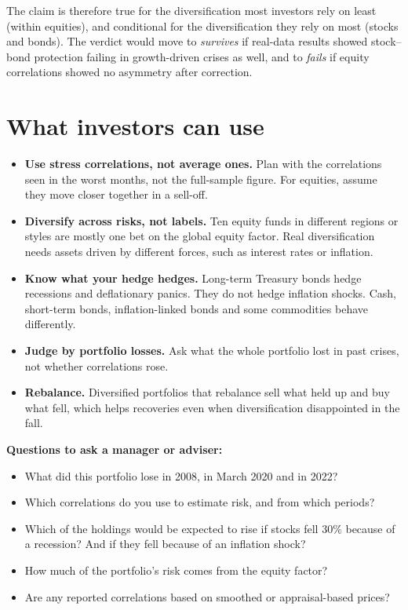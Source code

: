 The claim is therefore true for the diversification most investors rely on least (within equities), and conditional for the diversification they rely on most (stocks and bonds). The verdict would move to \emph{survives} if real-data results showed stock--bond protection failing in growth-driven crises as well, and to \emph{fails} if equity correlations showed no asymmetry after correction.

\section{What investors can use}
\label{sec:20-investors}

\begin{itemize}
  \item \textbf{Use stress correlations, not average ones.} Plan with the correlations seen in the worst months, not the full-sample figure. For equities, assume they move closer together in a sell-off.
  \item \textbf{Diversify across risks, not labels.} Ten equity funds in different regions or styles are mostly one bet on the global equity factor. Real diversification needs assets driven by different forces, such as interest rates or inflation.
  \item \textbf{Know what your hedge hedges.} Long-term Treasury bonds hedge recessions and deflationary panics. They do not hedge inflation shocks. Cash, short-term bonds, inflation-linked bonds and some commodities behave differently.
  \item \textbf{Judge by portfolio losses.} Ask what the whole portfolio lost in past crises, not whether correlations rose.
  \item \textbf{Rebalance.} Diversified portfolios that rebalance sell what held up and buy what fell, which helps recoveries even when diversification disappointed in the fall.
\end{itemize}

\textbf{Questions to ask a manager or adviser:}

\begin{itemize}
  \item What did this portfolio lose in 2008, in March 2020 and in 2022?
  \item Which correlations do you use to estimate risk, and from which periods?
  \item Which of the holdings would be expected to rise if stocks fell 30\% because of a recession? And if they fell because of an inflation shock?
  \item How much of the portfolio's risk comes from the equity factor?
  \item Are any reported correlations based on smoothed or appraisal-based prices?
\end{itemize}


